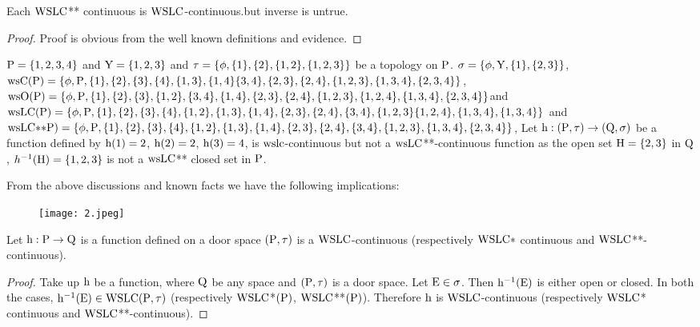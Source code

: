 \begin{thm}\label{thm7.3.5}
Each $\mathrm{WSLC}${*}{*} continuous is $\mathrm{WSLC}$-continuous.but inverse is untrue.
\end{thm}

\begin{proof}
Proof is obvious from the well known definitions and evidence.
\end{proof}

\begin{exm}\label{exam7.3.6}
$\mathrm{P} = \{1,2,3,4\}$ and $\mathrm{Y}= \{1,2,3\}$ and $\tau = \{\phi, \{1\},\{2\}, \{1,2\},\break \{1,2,3\}\}$ be a topology on $\mathrm{P}$. $\sigma = \{\phi, \mathrm{Y}, \{1\},\{ 2, 3\}\}$, $\ws\TSC(\TSP) = \{\phi, \TSP,\{1\}, \{2\}, \{3\},\break \{4\}, \{1,3\}, \{1, 4\} \{3,4\}, \{2,3\}, \{2,4\}, \{1,2, 3\},\{1,3,4\},\{2,3,4\}\}$, $\ws\TSO(\TSP) = \{\phi, \TSP,\break \{1\}, \{2\}, \{3\},\{1,2\}, \{3,4\}, \{1,4\}, \{2,3\}, \{2,4\}, \{1,2,3\}, \{1,2,4\},\{1,3,4\},\{2,3,4\}\}$\break and $\ws\LC(\TSP)= \{\phi, \TSP ,\{1\}, \{2\}, \{3\},\{4\},\{1,2\},\{1,3\}, \{1,4\}, \{2,3\}, \{2,4\},\{3,4\},\break \{1,2,3\}\{1,2,4\},\{1,3,4\},\{1,3,4\}\}$ and $\ws\LC{*}{*}\TSP)= \{\phi, \TSP,\{1\}, \{2\}, \{3\},\{4\},\{1,2\},\break \{1,3\}, \{1,4\}, \{2,3\}, \{2,4\},\{3,4\}, \{1, 2, 3\},\{1,3,4\},\{2,3,4\}\}$, Let $\mathrm{h}: (\mathrm{P}, \tau )\to(\mathrm{Q}, \sigma)$ be a function defined by $\mathrm{h}(1)= 2$, $\mathrm{h}(2)=2$, $\mathrm{h}(3)=4$, is $\mathrm{ws}\mathrm{lc}$-continuous but not a $\mathrm{ws}\mathrm{LC}${*}{*}-continuous function as the open set $\mathrm{H}=\{2,3\}$ in $\mathrm{Q}$, $h^{-1} (\mathrm{H})=\{1,2,3\}$ is not a $\mathrm{ws}\mathrm{LC}${*}{*} closed set in $\mathrm{P}$.
\end{exm}

\begin{rem}\label{rem7.3.1}
From the above discussions and known facts we have the following implications:
\begin{figure}[H]
\centering
\texttt{[image: 2.jpeg]}
\end{figure}
\end{rem}

\begin{thm}\label{thm7.3.6}
Let $\mathrm{h}: \mathrm{P} \to \mathrm{Q}$ is a function defined on a door space $(\mathrm{P},\tau)$ is a $\mathrm{WSLC}$-continuous (respectively $\mathrm{WSLC}*$ continuous and $\mathrm{WSLC}${*}{*}-continuous).
\end{thm}

\begin{proof}
Take up $\mathrm{h}$ be a function, where $\mathrm{Q}$ be any space and $(\mathrm{P}, \tau)$ is a door space. Let $\mathrm{E} \in \sigma$. Then $\mathrm{h}^{-1} (\mathrm{E})$ is either open or closed. In both the cases, $\mathrm{h}^{-1} (\mathrm{E}) \in \mathrm{WSLC}(\mathrm{P}, \tau)$ (respectively $\mathrm{WSLC}$*$(\mathrm{P})$, $\mathrm{WSLC}${*}{*}$(\mathrm{P})$). Therefore $\mathrm{h}$ is $\mathrm{WSLC}$-continuous (respectively $\mathrm{WSLC}$* continuous and $\mathrm{WSLC}${*}{*}-continuous).
\end{proof}

